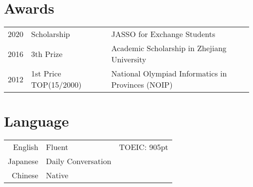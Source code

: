 \documentclass[]{deedy-resume-openfont}
\begin{document}
\begin{minipage}[t]{0.73\textwidth}

\section{Awards} 
\begin{tabular}{rll}
2020      & Scholarship & JASSO for Exchange Students \\
2016	     & 3th Prize  & Academic Scholarship in Zhejiang University \\
2012	     & 1st Price TOP(15/2000)  & National Olympiad Informatics in Provinces (NOIP) \\
\end{tabular}
\sectionsep



\section{Language} 
\begin{tabular}{rll}
English   & Fluent & TOEIC: 905pt \\
Japanese	     & Daily Conversation  &  \\
Chinese	     & Native  &  \\
\end{tabular}
\sectionsep



% 
% 

\end{minipage} 
\end{document}
